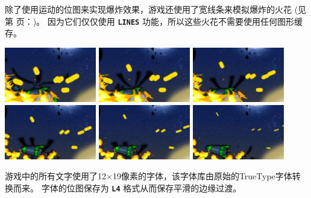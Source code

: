 \documentclass[10pt]{book}
\newcommand{\mach}[1]{\texttt{\textbf{#1}}}
\newcommand{\xref}[1]{第 \pageref{#1} 页：\textit{\nameref{#1}}}
\begin{document}
\begin{CJK}{UTF8}{gkai}
除了使用运动的位图来实现爆炸效果，游戏还使用了宽线条来模拟爆炸的火花 (见\xref{lines})。
因为它们仅仅使用 \mach{LINES} 功能，所以这些火花不需要使用任何图形缓存。
\begin{center}
\includegraphics[width=0.3\textwidth]{assets/ns-lines-0006.png}
\includegraphics[width=0.3\textwidth]{assets/ns-lines-0007.png}
\includegraphics[width=0.3\textwidth]{assets/ns-lines-0008.png}
\includegraphics[width=0.3\textwidth]{assets/ns-lines-0009.png}
\includegraphics[width=0.3\textwidth]{assets/ns-lines-0010.png}
\includegraphics[width=0.3\textwidth]{assets/ns-lines-0011.png}
\end{center}

\noindent
游戏中的所有文字使用了12$\times$19像素的字体，该字体库由原始的TrueType字体转换而来。
字体的位图保存为 \mach{L4} 格式从而保存平滑的边缘过渡。


\end{CJK}
\end{document}
